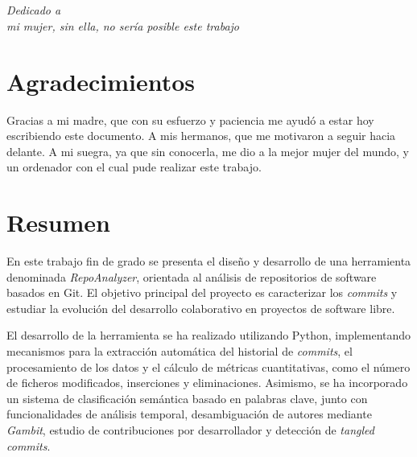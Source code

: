 \documentclass[a4paper, 12pt]{book}
\begin{document}

\chapter*{}
\begin{flushright}
\textit{Dedicado a \\
mi mujer, sin ella, no sería posible este trabajo}
\end{flushright}


\chapter*{Agradecimientos}

Gracias a mi madre, que con su esfuerzo y paciencia me ayudó a estar hoy escribiendo este documento. A mis hermanos, que me motivaron a seguir hacia delante. A mi suegra, ya que sin conocerla, me dio a la mejor mujer del mundo, y un ordenador con el cual pude realizar este trabajo.


\chapter*{Resumen}

En este trabajo fin de grado se presenta el diseño y desarrollo de una herramienta denominada \emph{RepoAnalyzer}, orientada al análisis de repositorios de software basados en Git. El objetivo principal del proyecto es caracterizar los \emph{commits} y estudiar la evolución del desarrollo colaborativo en proyectos de software libre.

El desarrollo de la herramienta se ha realizado utilizando Python, implementando mecanismos para la extracción automática del historial de \emph{commits}, el procesamiento de los datos y el cálculo de métricas cuantitativas, como el número de ficheros modificados, inserciones y eliminaciones. Asimismo, se ha incorporado un sistema de clasificación semántica basado en palabras clave, junto con funcionalidades de análisis temporal, desambiguación de autores mediante \emph{Gambit}, estudio de contribuciones por desarrollador y detección de \emph{tangled commits}.
\end{document}
